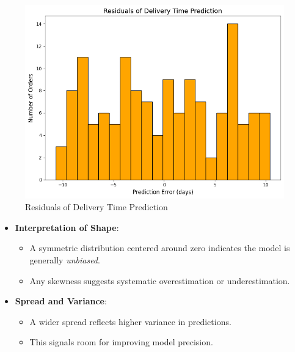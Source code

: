 \documentclass[10pt, twocolumn]{article}
\begin{document}
\begin{figure}[H]
    \centering
    \includegraphics[width=1\linewidth]{Images/residuals_of_delivery_time_prediction.png}
    \caption{Residuals of Delivery Time Prediction}
    \label{fig:residuals_of_delivery_time_prediction}
\end{figure}    
\begin{itemize}     
\item \textbf{Interpretation of Shape}:
\begin{itemize}
    \item A symmetric distribution centered around zero indicates the model is generally \textit{unbiased}.
    \item Any skewness suggests systematic overestimation or underestimation.
\end{itemize}

\item \textbf{Spread and Variance}:
\begin{itemize}
    \item A wider spread reflects higher variance in predictions.
    \item This signals room for improving model precision.
\end{itemize}
\end{itemize}
\end{document}
